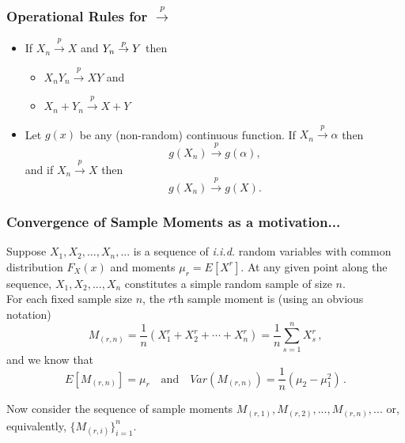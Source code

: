 \documentclass[notes=show,smaller,handout]{beamer}
\newenvironment{stepitemize}{\begin{itemize}[<+->]}{\end{itemize} }
\begin{document}
\begin{frame}%

\frametitle{Operational Rules for $\overset{p}{\rightarrow }$}

\begin{stepitemize}
\item If $X_{n}\overset{p}{\rightarrow }X $ and $Y_{n}\overset{p}{%
\rightarrow }Y $ then  \vspace{0.3cm}

\begin{stepitemize}
\item $X_{n}Y_{n}\overset{p}{\rightarrow }X Y$ and  \vspace{0.3cm}

\item $X_{n}+Y_{n}\overset{p}{\rightarrow }X +Y$
\end{stepitemize}

 \vspace{0.6cm}

\item Let $g\left( x\right) $ be any (non-random) continuous function. If $%
X_{n}\overset{p}{\rightarrow }\alpha $ then 
$$
g\left( X_{n}\right) \overset{p}{\rightarrow }g\left( \alpha \right),
$$ 
and if $X_{n}\overset{p}{\rightarrow }X $ then 
$$g\left( X_{n}\right) \overset{p}{\rightarrow }g\left( X \right).
$$

\end{stepitemize}


\end{frame}%

\begin{frame}%

\frametitle{Convergence of Sample Moments as a motivation...}

Suppose $X_{1},X_{2},...,X_{n},...$ is a sequence of \textit{i.i.d.} random variables with common distribution $F_X(x)$ and moments $\mu_r=E
[X^r]$. At any given point along the sequence, $X_{1},X_{2},...,X_{n}$ constitutes a simple random sample of size $n$. \\

For each fixed sample size $n$, the $r$th sample moment is (using an obvious notation)
\begin{equation*}
M_{(r,n)}=\frac{1}{n}\left( X_{1}^r+X_{2}^r+\cdots +X_{n}^r\right)=\frac{1}{n}\sum_{s=1}^nX_s^r\,,
\end{equation*}
and we know that \vspace{0.25cm}
$$
E[M_{(r,n)}]=\mu_r\quad\text{and}\quad Var(M_{(r,n)})=\frac{1}{n}(\mu_{2}-\mu_1^2)\,.
$$
\vspace{0.25cm}

Now consider the sequence of sample moments $M_{(r,1)},M_{(r,2)},...,M_{(r,n)},...$ or, equivalently, $\{M_{(r,i)}\}_{i=1}^{n}$.


\end{frame}%
\end{document}
